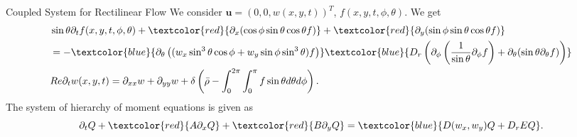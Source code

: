 \begin{frame}{Coupled System for Rectilinear Flow}
	\scriptsize
We consider $\boldsymbol{u} = \left( 0, 0, w(x,y, t)\right)^T$, $f(x,y,t,\phi,\theta)$. We get
\begin{equation}
	\begin{aligned}
		&\sin\theta \partial_{t}f(x,y,t,\phi, \theta)+ \textcolor{red}{\partial_x(\cos\phi \sin\theta \cos\theta f)} + \textcolor{red}{\partial_y(\sin \phi \sin \theta \cos \theta f)} \\
		&= -  \textcolor{blue}{\partial_\theta\left(( w_x \sin^3 \theta \cos \phi + w_y\sin \phi \sin^3 \theta) f\right)} \textcolor{blue}{D_{r}\left( \partial_\phi \left(\frac{1}{\sin \theta} \partial_\phi f \right)+ \partial_\theta (\sin \theta \partial_\theta f)\right)} \\
		&Re\partial_{t}w(x,y,t) = \partial_{xx}w + \partial_{yy}w + \delta\left(\bar{\rho}-\int_{0}^{2\pi} \int_{0}^{\pi} f \sin \theta d\theta d\phi \right).
	\end{aligned}
\end{equation}
The system of hierarchy of moment equations is given as
	\begin{equation}
		\partial_t Q + \textcolor{red}{A  \partial_x Q}
		+ \textcolor{red}{B \partial_y Q} =  \textcolor{blue}{ D(w_x,w_y)Q+ D_rEQ}.
	\end{equation}
\end{frame}

